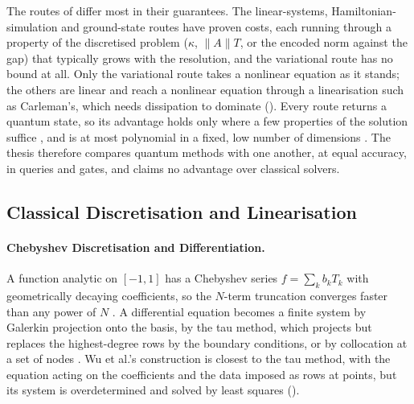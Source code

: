 The routes of  differ most in their guarantees. The linear-systems, Hamiltonian-simulation and ground-state routes have proven costs, each running through a property of the discretised problem ($\kappa$, $\|A\|T$, or the encoded norm against the gap) that typically grows with the resolution, and the variational route has no bound at all. Only the variational route takes a nonlinear equation as it stands; the others are linear and reach a nonlinear equation through a linearisation such as Carleman's, which needs dissipation to dominate (). Every route returns a quantum state, so its advantage holds only where a few properties of the solution suffice \cite{aaronson2015fineprint,williams2024readout}, and is at most polynomial in a fixed, low number of dimensions \cite{montanaro2016fem}. The thesis therefore compares quantum methods with one another, at equal accuracy, in queries and gates, and claims no advantage over classical solvers.

\subsection{Classical Discretisation and Linearisation}
\label{sec:bg-spectral}

\paragraph{Chebyshev Discretisation and Differentiation.}
\label{sec:bg-chebyshev}

A function analytic on $[-1,1]$ has a Chebyshev series $f=\sum_kb_kT_k$ with geometrically decaying coefficients, so the $N$-term truncation converges faster than any power of $N$ \cite{trefethen2013approximation}. A differential equation becomes a finite system by Galerkin projection onto the basis, by the tau method, which projects but replaces the highest-degree rows by the boundary conditions, or by collocation at a set of nodes \cite{canuto2006spectral,boyd2001Chebyshev}. Wu et al.'s construction is closest to the tau method, with the equation acting on the coefficients and the data imposed as rows at points, but its system is overdetermined and solved by least squares ().

